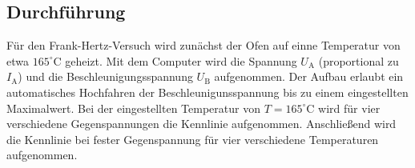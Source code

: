 \subsection{Durchführung}
Für den Frank-Hertz-Versuch wird zunächst der Ofen auf einne Temperatur von etwa $165^\circ$C geheizt. Mit dem Computer wird die Spannung $U_\mathrm{A}$ (proportional zu $I_\mathrm{A}$) und die Beschleunigungsspannung $U_\mathrm{B}$ aufgenommen. Der Aufbau erlaubt ein automatisches Hochfahren der Beschleunigunsspannung bis zu einem eingestellten Maximalwert. Bei der eingestellten Temperatur von $T=165^\circ$C wird für vier verschiedene Gegenspannungen die Kennlinie aufgenommen. Anschließend wird die Kennlinie bei fester Gegenspannung für vier verschiedene Temperaturen aufgenommen.
